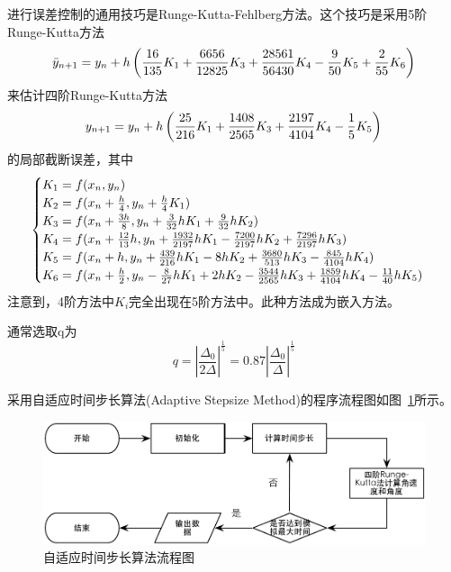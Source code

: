 \documentclass[a4paper,12pt,titlepage]{article}
\begin{document}
进行误差控制的通用技巧是Runge-Kutta-Fehlberg方法。这个技巧是采用5阶Runge-Kutta方法
\begin{equation}
	\bar{y}_{n+1}=y_n+h\left( \frac{16}{135}K_1+\frac{6656}{12825}K_3+\frac{28561}{56430}K_4-\frac{9}{50}K_5+\frac{2}{55}K_6 \right) \notag
\end{equation}
来估计四阶Runge-Kutta方法
\begin{equation}
	y_{n+1}=y_n+h\left( \frac{25}{216}K_1+\frac{1408}{2565}K_3+\frac{2197}{4104}K_4-\frac{1}{5}K_5 \right) \notag
\end{equation}
的局部截断误差，其中
\begin{equation}
	\begin{cases}
		K_1=f(x_n,y_n) \\
		K_2=f(x_n+\frac{h}{4},y_n+\frac{h}{4}K_1) \\
		K_3=f(x_n+\frac{3h}{8},y_n+\frac{3}{32}hK_1+\frac{9}{32}hK_2) \\
		K_4=f(x_n+\frac{12}{13}h,y_n+\frac{1932}{2197}hK_1-\frac{7200}{2197}hK_2+\frac{7296}{2197}hK_3) \\
		K_5=f(x_n+h,y_n+\frac{439}{216}hK_1-8hK_2+\frac{3680}{513}hK_3-\frac{845}{4104}hK_4) \\
		K_6=f(x_n+\frac{h}{2},y_n-\frac{8}{27}hK_1+2hK_2-\frac{3544}{2565}hK_3+\frac{1859}{4104}hK_4-\frac{11}{40}hK_5) 
	\end{cases}
	\notag
\end{equation}
注意到，4阶方法中$K_i$完全出现在5阶方法中。此种方法成为嵌入方法。

通常选取q为
\begin{equation}
	q=\left|\frac{\Delta_0}{2\Delta}\right|^{\frac{1}{5}}=0.87\left|\frac{\Delta_0}{\Delta}\right|^{\frac{1}{5}}
\end{equation}

采用自适应时间步长算法(Adaptive Stepsize Method)的程序流程图如图~\ref{fig:process_ASM}所示。
\begin{figure}[H]
\centering
\includegraphics[height=0.13\textheight]{./process_ASM.pdf}
\caption[Caption for LOF]{自适应时间步长算法流程图}
\label{fig:process_ASM}
\end{figure}
\end{document}
